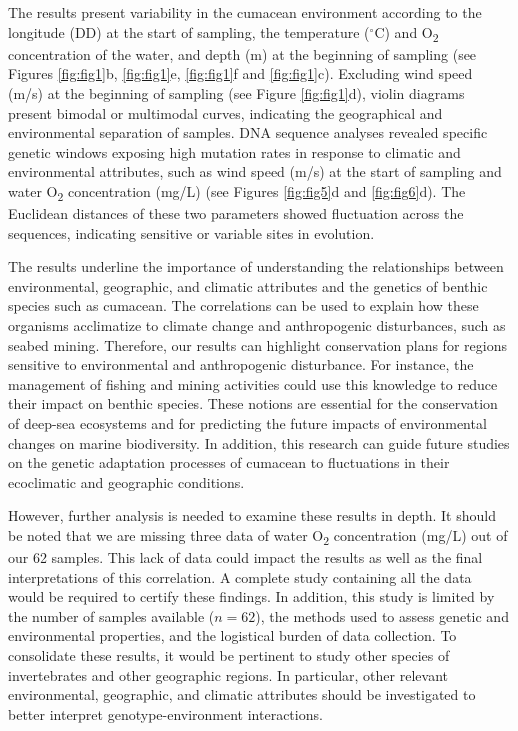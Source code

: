 The results present variability in the cumacean environment according to the longitude (DD) at the start of sampling, the temperature ($^\circ$C) and  O\textsubscript{2} concentration of the water, and depth (m) at the beginning of sampling (see Figures \ref{fig:fig1}b, \ref{fig:fig1}e, \ref{fig:fig1}f and \ref{fig:fig1}c). Excluding wind speed (m/s) at the beginning of sampling (see Figure \ref{fig:fig1}d), violin diagrams present bimodal or multimodal curves, indicating the geographical and environmental separation of samples. DNA sequence analyses revealed specific genetic windows exposing high mutation rates in response to climatic and environmental attributes, such as wind speed (m/s) at the start of sampling and water O\textsubscript{2} concentration (mg/L) (see Figures \ref{fig:fig5}d and \ref{fig:fig6}d). The Euclidean distances of these two parameters showed fluctuation across the sequences, indicating sensitive or variable sites in evolution.

The results underline the importance of understanding the relationships between environmental, geographic, and climatic attributes and the genetics of benthic species such as cumacean. The correlations can be used to explain how these organisms acclimatize to climate change and anthropogenic disturbances, such as seabed mining. Therefore, our results can highlight conservation plans for regions sensitive to environmental and anthropogenic disturbance. For instance, the management of fishing and mining activities could use this knowledge to reduce their impact on benthic species. These notions are essential for the conservation of deep-sea ecosystems and for predicting the future impacts of environmental changes on marine biodiversity. In addition, this research can guide future studies on the genetic adaptation processes of cumacean to fluctuations in their ecoclimatic and geographic conditions.

However, further analysis is needed to examine these results in depth. It should be noted that we are missing three data of water O\textsubscript{2} concentration (mg/L) out of our 62 samples. This lack of data could impact the results as well as the final interpretations of this correlation. A complete study containing all the data would be required to certify these findings. In addition, this study is limited by the number of samples available ($n=62$), the methods used to assess genetic and environmental properties, and the logistical burden of data collection. To consolidate these results, it would be pertinent to study other species of invertebrates and other geographic regions. In particular, other relevant environmental, geographic, and climatic attributes should be investigated to better interpret genotype-environment interactions.


